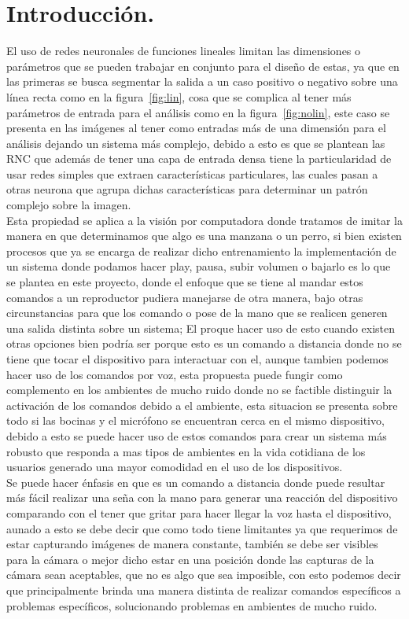 \documentclass[a4paper, 12pt]{article}
\begin{document}
    \section{Introducción.}
    El uso de redes neuronales de funciones lineales limitan las dimensiones o parámetros que se pueden trabajar en conjunto para el diseño de estas, ya que en las primeras se busca segmentar la salida a un caso positivo o negativo sobre una línea recta como en la figura~\ref{fig:lin}, cosa que se complica al tener más parámetros de entrada para el análisis como en la figura~\ref{fig:nolin}, este caso se presenta en las imágenes al tener como entradas más de una dimensión para el análisis dejando un sistema más complejo, debido a esto es que se plantean las RNC que además de tener una capa de entrada densa tiene la particularidad de usar redes simples que extraen características particulares, las cuales pasan a otras neurona que agrupa dichas características para determinar un patrón complejo sobre la imagen.\\
    Esta propiedad se aplica a la visión por computadora donde tratamos de imitar la manera en que determinamos que algo es una manzana o un perro, si bien existen procesos que ya se encarga de realizar dicho entrenamiento la implementación de un sistema donde podamos hacer play, pausa, subir volumen o bajarlo es lo que se plantea en este proyecto, donde el enfoque que se tiene al mandar estos comandos a un reproductor pudiera manejarse de otra manera, bajo otras circunstancias para que los comando o pose de la mano que se realicen generen una salida distinta sobre un sistema; El proque hacer uso de esto cuando existen otras opciones bien podría ser porque esto es un comando a distancia donde no se tiene que tocar el dispositivo para interactuar con el, aunque tambien podemos hacer uso de los comandos por voz, esta propuesta puede fungir como complemento en los ambientes de mucho ruido donde no se factible distinguir la activación de los comandos debido a el ambiente, esta situacion se presenta sobre todo si las bocinas y el micrófono se encuentran cerca en el mismo dispositivo, debido a esto se puede hacer uso de estos comandos para crear un sistema más robusto que responda a mas tipos de ambientes en la vida cotidiana de los usuarios  generado una mayor comodidad en el uso de los dispositivos.\\
    Se puede hacer énfasis en que es un comando a distancia donde puede resultar más fácil realizar una seña con la mano para generar una reacción del dispositivo comparando con el tener que gritar para hacer llegar la voz hasta el dispositivo, aunado a  esto se debe decir que como todo tiene limitantes ya que requerimos de estar capturando imágenes de manera constante, también se debe ser visibles para la cámara o mejor dicho estar en una posición donde las capturas de la cámara sean aceptables, que no es algo que sea imposible, con esto podemos decir que principalmente brinda una manera distinta de realizar comandos específicos a problemas específicos, solucionando problemas en ambientes de mucho ruido.
\end{document}
